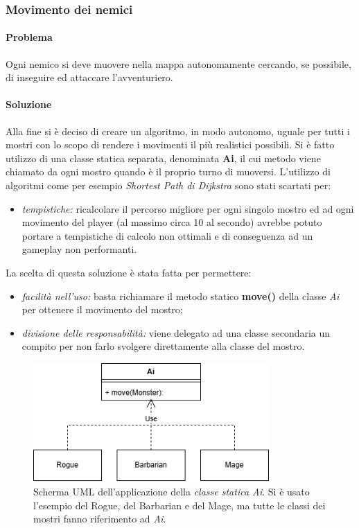 \documentclass{report}
\begin{document}
\clearpage
\subsubsection{Movimento dei nemici}

\paragraph{Problema} Ogni nemico si deve muovere nella mappa autonomamente cercando, se possibile, di inseguire ed attaccare l'avventuriero.

\paragraph{Soluzione} Alla fine si è deciso di creare un algoritmo, in modo autonomo, uguale per tutti i mostri con lo scopo di rendere i movimenti il più realistici possibili. Si è fatto 
%
utilizzo di una classe statica separata, denominata \textbf{Ai}, il cui metodo viene chiamato da ogni mostro quando è il proprio turno di muoversi. L'utilizzo di algoritmi come per esempio
%
\textit{Shortest Path di Dijkstra} sono stati scartati per:

\begin{itemize}
    \item \textit{tempistiche:} ricalcolare il percorso migliore per ogni singolo mostro ed ad ogni movimento del player (al massimo circa 10 al secondo) avrebbe potuto portare a tempistiche di calcolo
%
non ottimali e di conseguenza ad un gameplay non performanti.
\end{itemize}

%
La scelta di questa soluzione è stata fatta per permettere:

\begin{itemize}
    \item \textit{facilità nell'uso:} basta richiamare il metodo statico \textbf{move()} della classe \textit{Ai} per ottenere il movimento del mostro;
    \item \textit{divisione delle responsabilità:} viene delegato ad una classe secondaria un compito per non farlo svolgere direttamente alla classe del mostro.
\end{itemize}

\begin{figure}[H]
    \centering
    \includegraphics[width=9cm]{MonsterMovement.png}
    \caption{Scherma UML dell'applicazione della \textit{classe statica Ai}. Si è usato l'esempio del Rogue, del Barbarian e del Mage, ma tutte le classi dei mostri fanno riferimento ad \textit{Ai}.}
\end{figure}
\end{document}

